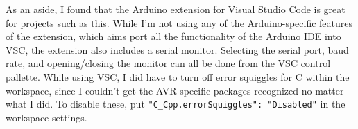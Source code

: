 \documentclass[11pt]{article}
\begin{document}
As an aside, I found that the Arduino extension for Visual Studio Code is great 
for projects such as this. While I'm not using any of the Arduino-specific 
features of the extension, which aims port all the functionality of the 
Arduino IDE into VSC, the extension also includes a serial monitor. Selecting 
the serial port, baud rate, and opening/closing the monitor can all be done 
from the VSC control pallette. While using VSC, I did have to turn off 
error squiggles for C within the workspace, since I couldn't get the AVR specific 
packages recognized no matter what I did. To disable these, put \texttt{"C\_Cpp.errorSquiggles": "Disabled"} 
in the workspace settings.
  
\end{document}
